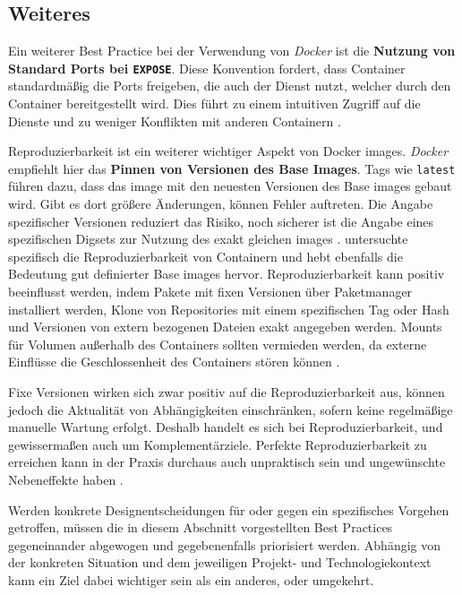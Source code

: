 \subsection{Weiteres}
\label{subsec:05-03-04_further}

Ein weiterer Best Practice bei der Verwendung von \textit{Docker} ist die \textbf{Nutzung von Standard Ports bei \texttt{EXPOSE}}. Diese Konvention fordert, dass Container standardmäßig die Ports freigeben, die auch der Dienst nutzt, welcher durch den Container bereitgestellt wird. Dies führt zu einem intuitiven Zugriff auf die Dienste und zu weniger Konflikten mit anderen Containern \cite{300:Building-Best-Practices}.

Reproduzierbarkeit ist ein weiterer wichtiger Aspekt von Docker \Glspl{image}. \textit{Docker} empfiehlt hier das \textbf{Pinnen von Versionen des Base Images}. Tags wie \texttt{latest} führen dazu, dass das \Gls{image} mit den neuesten Versionen des Base \Glspl{image} gebaut wird. Gibt es dort größere Änderungen, können Fehler auftreten. Die Angabe spezifischer Versionen reduziert das Risiko, noch sicherer ist die Angabe eines spezifischen Digsets zur Nutzung des exakt gleichen \Glspl{image} \cite{300:Building-Best-Practices}. \citeauthor{013:Role-of-Containers-in-Reproducibility} untersuchte spezifisch die Reproduzierbarkeit von Containern und hebt ebenfalls die Bedeutung gut definierter Base \Glspl{image} hervor. Reproduzierbarkeit kann positiv beeinflusst werden, indem Pakete mit fixen Versionen über Paketmanager installiert werden, Klone von Repositories mit einem spezifischen Tag oder Hash und Versionen von extern bezogenen Dateien exakt angegeben werden. Mounts für Volumen außerhalb des Containers sollten vermieden werden, da externe Einflüsse die Geschlossenheit des Containers stören können \cite{013:Role-of-Containers-in-Reproducibility}.

Fixe Versionen wirken sich zwar positiv auf die Reproduzierbarkeit aus, können jedoch die Aktualität von Abhängigkeiten einschränken, sofern keine regelmäßige manuelle Wartung erfolgt. Deshalb handelt es sich bei Reproduzierbarkeit,  und  gewissermaßen auch um Komplementärziele. Perfekte Reproduzierbarkeit zu erreichen kann in der Praxis durchaus auch unpraktisch sein und ungewünschte Nebeneffekte haben \cite{013:Role-of-Containers-in-Reproducibility}.

Werden konkrete Designentscheidungen für oder gegen ein spezifisches Vorgehen getroffen, müssen die in diesem Abschnitt vorgestellten Best Practices gegeneinander abgewogen und gegebenenfalls priorisiert werden. Abhängig von der konkreten Situation und dem jeweiligen Projekt- und Technologiekontext kann ein Ziel dabei wichtiger sein als ein anderes, oder umgekehrt.

